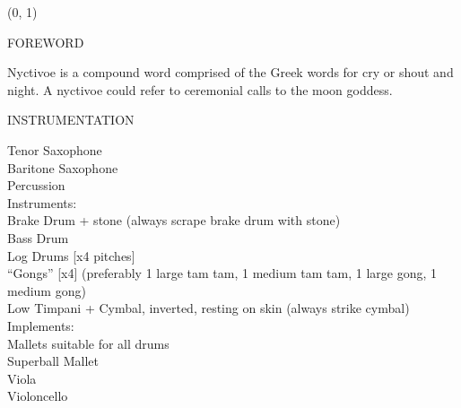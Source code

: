 \documentclass[11pt]{article}
\begin{document}
\begin{textblock}{23}(0, 1)
\begin{center}
\huge FOREWORD
\end{center}
\end{textblock}

\vspace*{0.25\baselineskip}

\begingroup

\begin{center}
Nyctivoe is a compound word comprised of the Greek words for cry or shout and night. A nyctivoe could refer to ceremonial calls to the moon goddess.
\rightskip\leftskip
\phantom{text} \hfill \phantom{()}
\end{center}

\endgroup

\vspace*{5\baselineskip}

\begin{center}
\huge INSTRUMENTATION
\end{center}

\hspace*{1cm} Tenor Saxophone
\\
\hspace*{1cm} Baritone Saxophone
\\
\hspace*{1cm} Percussion
\\
\hspace*{2cm} Instruments:
\\
\hspace*{3cm} Brake Drum + stone (always scrape brake drum with stone)
\\
\hspace*{3cm} Bass Drum
\\
\hspace*{3cm} Log Drums [x4 pitches]
\\
\hspace*{3cm} ``Gongs'' [x4] (preferably 1 large tam tam, 1 medium tam tam, 1 large gong, 1 medium gong)
\\
\hspace*{3cm} Low Timpani + Cymbal, inverted, resting on skin (always strike cymbal)
\\
\hspace*{2cm} Implements:
\\
\hspace*{3cm} Mallets suitable for all drums
\\
\hspace*{3cm} Superball Mallet
\\
\hspace*{1cm} Viola
\\
\hspace*{1cm} Violoncello
\end{document}
